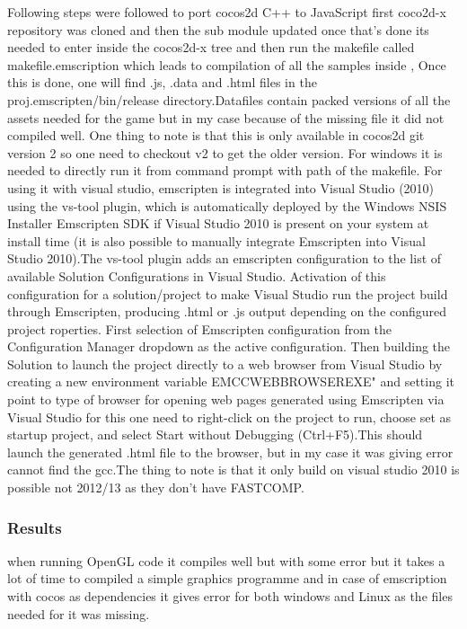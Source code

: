 \documentclass[23pt]{article}
\begin{document}
{\Large Following steps were followed to port cocos2d C++ to JavaScript first coco2d-x repository was cloned and then the sub module updated once that’s done its needed to enter inside the cocos2d-x tree and then run the makefile called makefile.emscription which leads to compilation of all the samples inside , Once this is  done, one will find .js, .data and .html files in the proj.emscripten/bin/release directory.Datafiles contain packed versions of all the assets needed for the game but in my case because of the missing file it did not compiled well. One thing to note is that this is only available in cocos2d git version 2 so one need to checkout v2 to get the older version. For windows it is needed to directly run it from command prompt with path of the makefile. For using it with visual studio, emscripten is integrated into Visual Studio (2010) using the vs-tool plugin, which is automatically deployed by the Windows NSIS Installer Emscripten SDK if Visual Studio 2010 is present on your system at install time (it is also possible to manually integrate Emscripten into Visual Studio 2010).The vs-tool plugin adds an emscripten configuration to the list of available Solution Configurations in Visual Studio. Activation of this configuration for a solution/project to make Visual Studio run the project build through Emscripten, producing .html or .js output depending on the configured project roperties. First selection of Emscripten configuration from the Configuration Manager dropdown as the active configuration. Then  building the Solution to launch the project directly to a web browser from Visual Studio by creating a new environment variable EMCCWEBBROWSEREXE" and setting it point to type of browser for opening web pages generated using Emscripten via Visual Studio for this one need to right-click on the project to run, choose set as startup project, and select Start without Debugging (Ctrl+F5).This should launch the generated .html file to the browser, but in my case it was giving error cannot find the gcc.The thing to note is that it only build on visual studio 2010 is possible not 2012/13 as they don’t have FASTCOMP. \par}

\subsubsection{Results}

{\Large when running OpenGL code it compiles well but with some error but it takes a lot of time to compiled a simple graphics programme and in case of emscription with cocos as dependencies it gives error for both windows and Linux as the files needed for it was missing. \par}
\end{document}
